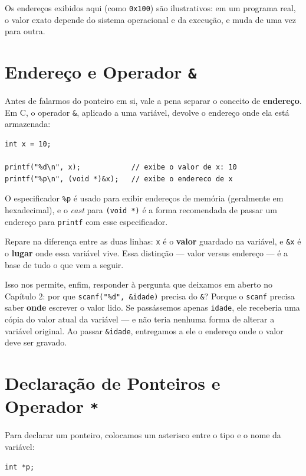 Os endereços exibidos aqui (como \texttt{0x100}) são ilustrativos: em um programa real, o valor exato depende do sistema operacional e da execução, e muda de uma vez para outra.

\section{Endereço e Operador \texttt{\&}}

Antes de falarmos do ponteiro em si, vale a pena separar o conceito de \textbf{endereço}. Em C, o operador \texttt{\&}, aplicado a uma variável, devolve o endereço onde ela está armazenada:

\begin{lstlisting}
int x = 10;

printf("%d\n", x);            // exibe o valor de x: 10
printf("%p\n", (void *)&x);   // exibe o endereco de x
\end{lstlisting}

O especificador \texttt{\%p} é usado para exibir endereços de memória (geralmente em hexadecimal), e o \textit{cast} para \texttt{(void *)} é a forma recomendada de passar um endereço para \texttt{printf} com esse especificador.

Repare na diferença entre as duas linhas: \texttt{x} é o \textbf{valor} guardado na variável, e \texttt{\&x} é o \textbf{lugar} onde essa variável vive. Essa distinção — valor versus endereço — é a base de tudo o que vem a seguir.

Isso nos permite, enfim, responder à pergunta que deixamos em aberto no Capítulo 2: por que \texttt{scanf("\%d", \&idade)} precisa do \texttt{\&}? Porque o \texttt{scanf} precisa saber \textbf{onde} escrever o valor lido. Se passássemos apenas \texttt{idade}, ele receberia uma cópia do valor atual da variável — e não teria nenhuma forma de alterar a variável original. Ao passar \texttt{\&idade}, entregamos a ele o endereço onde o valor deve ser gravado.

\section{Declaração de Ponteiros e Operador \texttt{*}}

Para declarar um ponteiro, colocamos um asterisco entre o tipo e o nome da variável:

\begin{lstlisting}
int *p;
\end{lstlisting}

